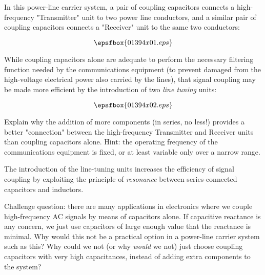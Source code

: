 

In this power-line carrier system, a pair of coupling capacitors connects a high-frequency "Transmitter" unit to two power line conductors, and a similar pair of coupling capacitors connects a "Receiver" unit to the same two conductors:

$$\epsfbox{01394x01.eps}$$

While coupling capacitors alone are adequate to perform the necessary filtering function needed by the communications equipment (to prevent damaged from the high-voltage electrical power also carried by the lines), that signal coupling may be made more efficient by the introduction of two {\it line tuning} units:

$$\epsfbox{01394x02.eps}$$

Explain why the addition of more components (in series, no less!) provides a better "connection" between the high-frequency Transmitter and Receiver units than coupling capacitors alone.  Hint: the operating frequency of the communications equipment is fixed, or at least variable only over a narrow range.







The introduction of the line-tuning units increases the efficiency of signal coupling by exploiting the principle of {\it resonance} between series-connected capacitors and inductors.

\vskip 10pt

Challenge question: there are many applications in electronics where we couple high-frequency AC signals by means of capacitors alone.  If capacitive reactance is any concern, we just use capacitors of large enough value that the reactance is minimal.  Why would this not be a practical option in a power-line carrier system such as this?  Why could we not (or why {\it would} we not) just choose coupling capacitors with very high capacitances, instead of adding extra components to the system?







